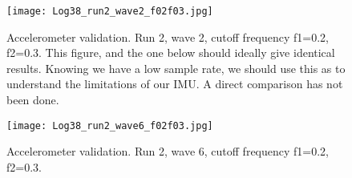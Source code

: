 





\begin{figure}[htbp]
        \centering
        \texttt{[image: Log38\_run2\_wave2\_f02f03.jpg]}
        \caption{Accelerometer validation. Run 2, wave 2, cutoff frequency f1=0.2, f2=0.3. This figure, and the one below should ideally give identical results. Knowing we have a low sample rate, we should use this as to understand the limitations of our IMU. A direct comparison has not been done.}
        \label{fig:}
\end{figure}

\begin{figure}
        \centering
        \texttt{[image: Log38\_run2\_wave6\_f02f03.jpg]}
        \caption{Accelerometer validation. Run 2, wave 6, cutoff frequency f1=0.2, f2=0.3.}
        \label{fig:}
\end{figure}



